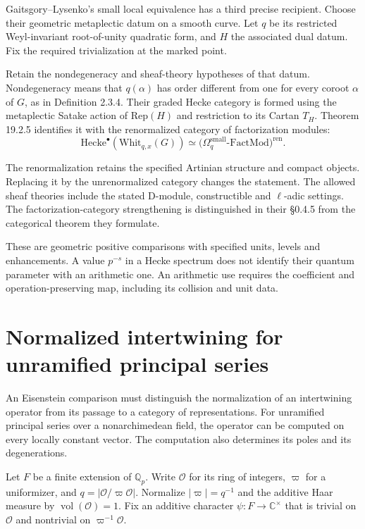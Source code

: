 Gaitsgory--Lysenko's small local equivalence has a third precise
recipient. Choose their geometric metaplectic datum on a smooth curve.
Let \(q\) be its restricted Weyl-invariant root-of-unity quadratic
form, and \(H\) the associated dual datum.
Fix the required trivialization at the marked point.

Retain the nondegeneracy
and sheaf-theory hypotheses of that datum. Nondegeneracy means
that \(q(\alpha)\) has order different from one for every
coroot \(\alpha\) of \(G\), as in Definition 2.3.4.
Their graded Hecke category is formed using the metaplectic
Satake action of \(\mathrm{Rep}(H)\) and restriction to its
Cartan \(T_H\).
Theorem 19.2.5 identifies it with the renormalized category of
factorization modules:
\[
 \mathrm{Hecke}^{\bullet}(\mathrm{Whit}_{q,x}(G))
   \simeq
 \bigl(\Omega_q^{\mathrm{small}}
           \text{-}\mathrm{FactMod}\bigr)^{\mathrm{ren}}.
\]

The renormalization retains the specified Artinian structure and
compact objects. Replacing it by the unrenormalized category
changes the statement.
The allowed sheaf theories include the stated D-module,
constructible and \(\ell\)-adic settings.
The factorization-category strengthening is distinguished in
their \S0.4.5 from the categorical theorem they formulate.

These are geometric positive comparisons with specified units,
levels and enhancements. A value \(p^{-s}\) in a Hecke spectrum
does not identify their quantum parameter with an arithmetic one.
An arithmetic use requires the coefficient and operation-preserving
map, including its collision and unit data.


\section{Normalized intertwining for unramified principal series}

An Eisenstein comparison must distinguish the normalization of an
intertwining operator from its passage to a category of representations.
For unramified principal series over a nonarchimedean field, the operator
can be computed on every locally constant vector.
The computation also determines its poles and its degenerations.

Let $F$ be a finite extension of $\mathbb Q_p$.
Write $\mathcal O$ for its ring of integers, $\varpi$ for a uniformizer,
and $q=|\mathcal O/\varpi\mathcal O|$.
Normalize $|\varpi|=q^{-1}$ and the additive Haar measure by
$\operatorname{vol}(\mathcal O)=1$.
Fix an additive character $\psi:F\to\mathbb C^\times$ that is trivial on
$\mathcal O$ and nontrivial on $\varpi^{-1}\mathcal O$.

